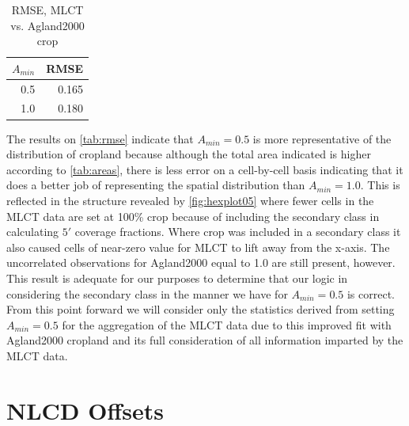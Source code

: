 \begin{table}[ht]
\begin{center}
\begin{tabular}{rr}
  \hline
$A_{min}$ & RMSE \\ 
  \hline
0.5 & 0.165 \\ 
  1.0 & 0.180 \\ 
   \hline
\end{tabular}
\caption{RMSE, MLCT vs. Agland2000 crop}
\label{tab:rmse}
\end{center}
\end{table}

The results on \autoref{tab:rmse} indicate that $A_{min}=0.5$ is more
representative of the distribution of cropland because although the
total area indicated is higher according to \autoref{tab:areas}, there
is less error on a cell-by-cell basis indicating that it does a better
job of representing the spatial distribution than $A_{min}=1.0$.  This
is reflected in the structure revealed by \autoref{fig:hexplot05}
where fewer cells in the MLCT data are set at 100\% crop because of
including the secondary class in calculating $5'$ coverage fractions.
Where crop was included in a secondary class it also caused cells of
near-zero value for MLCT to lift away from the x-axis.  The
uncorrelated observations for Agland2000 equal to 1.0 are still
present, however.  This result is adequate for our purposes to
determine that our logic in considering the secondary class in the
manner we have for $A_{min}=0.5$ is correct.  From this point forward
we will consider only the statistics derived from setting
$A_{min}=0.5$ for the aggregation of the MLCT data due to this
improved fit with Agland2000 cropland and its full consideration of
all information imparted by the MLCT data.


\section{NLCD Offsets}
\label{sec:nlcd_offsets}


